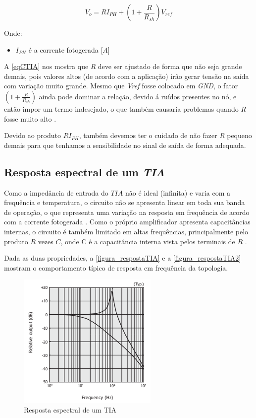 \begin{equation}
    \label{eqCTIA}
    V_o = RI_{PH} + (1+\frac{R}{R_{sh}})V_{ref}
\end{equation}

Onde:
\begin{itemize}
    \item $I_{PH}$ \'e a corrente fotogerada [$A$]
\end{itemize}

A \autoref{eqCTIA} nos mostra que \emph{R} deve ser ajustado de forma que n\~ao seja grande demais, pois valores altos (de acordo com a aplicação) irão gerar tens\~ao na sa\'ida com varia{\c c}\~ao muito grande. Mesmo que \emph{Vref} fosse colocado em \emph{GND}, o fator $(1+\frac{R}{R_{sh}})$ ainda pode dominar a relação, devido \'a ruídos presentes no nó, e então impor um termo indesejado, o que também causaria problemas quando \emph{R} fosse muito alto \cite{hamamatsu}.

Devido ao produto $RI_{PH}$, também devemos ter o cuidado de não fazer \textit{R} pequeno demais para que tenhamos a sensibilidade no sinal de saída de forma adequada.

\subsection{Resposta espectral de um \emph{TIA}}

Como a imped\^ancia de entrada do $TIA$ n\~ao \'e ideal (infinita) e varia com a frequ\^encia e temperatura, o circuito n\~ao se apresenta linear em toda sua banda de opera{\c c}\~ao, o que representa uma varia{\c c}\~ao na resposta em frequ\^encia de acordo com a corrente fotogerada \cite{hamamatsu}.
Como o pr\'oprio amplificador apresenta capacit\^ancias internas, o circuito \'e tamb\'em limitado em altas frequ\^encias, principalmente pelo produto $R$ vezes $C$, onde C \'e a capacit\^ancia interna vista pelos terminais de $R$ \cite{hamamatsu}.

Dada as duas propriedades, a \autoref{figura_respostaTIA} e a \autoref{figura_respostaTIA2} mostram o comportamento t\'ipico de resposta em frequ\^encia da topologia.

\begin{figure}[htb]
	\caption{\label{figura_respostaTIA}Resposta espectral de um TIA}
	\begin{center}
	    \includegraphics[scale=0.8]{Imagens/RespostaEspectralTIA.png}
	\end{center}
\end{figure}

